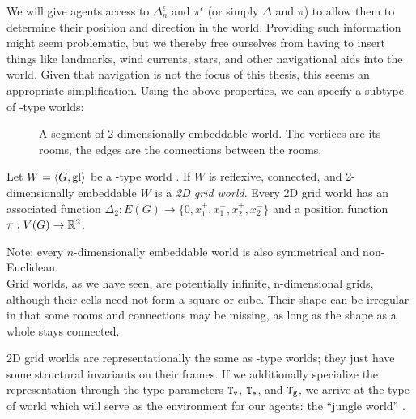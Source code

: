 We will give agents access to $\Delta_n^\epsilon$ and $\pi^\epsilon$ (or simply $\Delta$ and $\pi$) to allow them to determine their position and direction in the world. Providing such information might seem problematic, but we thereby free ourselves from having to insert things like landmarks, wind currents, stars, and other navigational aids into the world. Given that navigation is not the focus of this thesis, this seems an appropriate simplification. Using the above properties, we can specify a subtype of \wext-type worlds:

\begin{figure}
	\centering
	
	\caption{A segment of 2-dimensionally embeddable world. The vertices are its rooms, the edges are the connections between the rooms.}
	\label{fig:2dgrid}
\end{figure}

\begin{definition}
	Let $W = \langle G,\mathrm{gl} \rangle$ be a \wext-type world . If $W$ is reflexive, connected, and 2-dimensionally embeddable $W$ is a {\em 2D grid world}.
	Every 2D grid world has an associated function $\Delta_2 : E(G) \rightarrow \{0,x_1^+,x_1^-,x_2^+,x_2^- \}$ and a position function $\pi : V(G) \rightarrow \mathbb{R}^2$.
\end{definition}

\noindent
Note: every $n$-dimensionally embeddable world is also symmetrical and non-Euclidean.\\

Grid worlds, as we have seen, are potentially infinite, n-dimensional grids, although their cells need not form a square or cube. Their shape can be irregular in that some rooms and connections may be missing, as long as the shape as a whole stays connected.

2D grid worlds are representationally the same as \wext-type worlds; they just have some structural invariants on their frames. If we additionally specialize the representation through the type parameters $\mathtt{T_v}$, $\mathtt{T_e}$, and $\mathtt{T_g}$, we arrive at the type of world which will serve as the environment for our agents: the ``jungle world'' \wjun.

